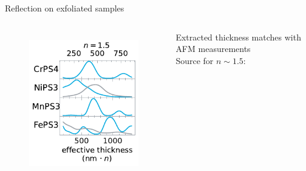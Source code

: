 \documentclass[
	10pt,
]{beamer}
\begin{document}
\begin{frame}{Reflection on exfoliated samples}
\begin{columns}
		\begin{figure}
			\centering
			\includegraphics[width=\textwidth]{../figures/2024-03-14 thickness flakes.pdf}\\
		\end{figure}
		Extracted thickness matches with AFM measurements\\
		\vspace{1cm}
		\tiny
		Source for $n\sim1.5$: 		
	\end{columns}
\end{frame}
\end{document}
